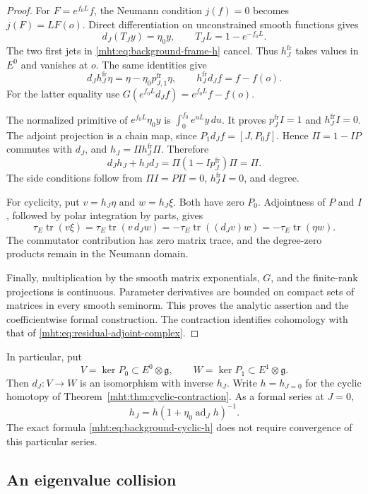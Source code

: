 \begin{proof}
For $F=e^{f_0L}f$, the Neumann condition $j(f)=0$ becomes
$j(F)=LF(o)$. Direct differentiation on unconstrained smooth functions
gives
\[
 d_J(T_Jy)=\eta_0y,\qquad T_JL=1-e^{-f_0L}.
\]
The two first jets in \eqref{mht:eq:background-frame-h} cancel.
Thus $h^{\mathrm{fr}}_J$ takes values in $E^0$ and vanishes at $o$.
The same identities give
\[
 d_Jh^{\mathrm{fr}}_J\eta
       =\eta-\eta_0p^{\mathrm{fr}}_{J,1}\eta,\qquad
 h^{\mathrm{fr}}_Jd_Jf=f-f(o).
\]
For the latter equality use
$G(e^{f_0L}d_Jf)=e^{f_0L}f-f(o)$.

The normalized primitive of $e^{f_0L}\eta_0y$ is
$\int_0^{f_0}e^{uL}y\,du$. It proves
$p^{\mathrm{fr}}_JI=1$ and $h^{\mathrm{fr}}_JI=0$.
The adjoint projection is a chain map, since
$P_1d_Jf=[J,P_0f]$. Hence $\Pi=1-IP$ commutes with $d_J$, and
$h_J=\Pi h^{\mathrm{fr}}_J\Pi$. Therefore
\[
 d_Jh_J+h_Jd_J
   =\Pi(1-Ip^{\mathrm{fr}}_J)\Pi=\Pi.
\]
The side conditions follow from $\Pi I=P\Pi=0$,
$h^{\mathrm{fr}}_JI=0$, and degree.

For cyclicity, put $v=h_J\eta$ and $w=h_J\xi$.
Both have zero $P_0$. Adjointness of $P$ and $I$, followed by polar
integration by parts, gives
\[
 \tau_E\operatorname{tr}(v\xi)
 =\tau_E\operatorname{tr}(v\,d_Jw)
 =-\tau_E\operatorname{tr}((d_Jv)w)
 =-\tau_E\operatorname{tr}(\eta w).
\]
The commutator contribution has zero matrix trace, and the degree-zero
products remain in the Neumann domain.

Finally, multiplication by the smooth matrix exponentials, $G$, and the
finite-rank projections is continuous. Parameter derivatives are
bounded on compact sets of matrices in every smooth seminorm.
This proves the analytic assertion and the coefficientwise formal
construction. The contraction identifies cohomology with that of
\eqref{mht:eq:residual-adjoint-complex}.
\end{proof}

In particular, put
\[
 V=\ker P_0\subset E^0\otimes\mathfrak g,\qquad
 W=\ker P_1\subset E^1\otimes\mathfrak g.
\]
Then $d_J:V\to W$ is an isomorphism with inverse $h_J$.
Write $h=h_{J=0}$ for the cyclic homotopy of
Theorem~\ref{mht:thm:cyclic-contraction}.
As a formal series at $J=0$,
\[
 h_J=h(1+\eta_0\operatorname{ad}_Jh)^{-1}.
\]
The exact formula \eqref{mht:eq:background-cyclic-h} does not require
convergence of this particular series.

\subsection{An eigenvalue collision}

